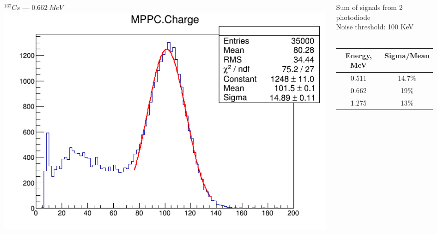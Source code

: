 \documentclass[11pt]{beamer}
\begin{document}
\begin{frame}
    \begin{columns}
    \begin{column}{0.5\textwidth}
        $^{137}Cs$ --- $0.662~MeV$\\
        \includegraphics[width=1\textwidth]{figures/setup2.png}
    \end{column}
    \begin{column}{0.5\textwidth}
                Sum of signals from 2 photodiode\\
                Noise threshold: 100 KeV\\
                ~\\
        \begin{tabular}[c]{|c|c|}
             \hline 
            Energy, MeV & Sigma/Mean \\
            \hline 
           0.511 & 14.7\%  \\ 
            \hline 
            0.662 & 19\%\\ 
            \hline 
            1.275 & 13\%\\
            \hline 
        \end{tabular} 
\\

    \end{column}
\end{columns} 
     
\end{frame}
\end{document}
